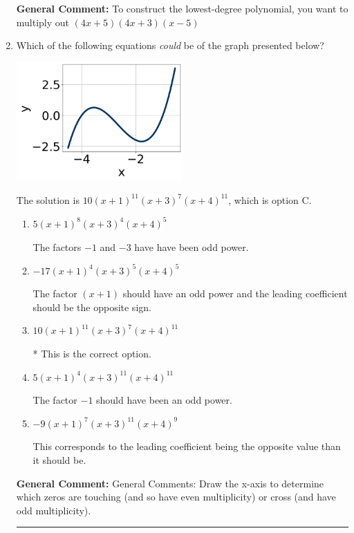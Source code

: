 \documentclass{extbook}[14pt]
\newcommand{\litem}[1]{\item #1

\rule{\textwidth}{0.4pt}}
\begin{document}
\begin{enumerate}
{\textbf{General Comment:} To construct the lowest-degree polynomial, you want to multiply out $(4x + 5)(4x + 3)(x -5)$
}
\litem{
Which of the following equations \textit{could} be of the graph presented below?

\begin{center}
    \includegraphics[width=0.5\textwidth]{../Figures/polyGraphToFunctionA.png}
\end{center}


The solution is \( 10(x + 1)^{11} (x + 3)^{7} (x + 4)^{11} \), which is option C.\begin{enumerate}[label=\Alph*.]
\item \( 5(x + 1)^{8} (x + 3)^{4} (x + 4)^{5} \)

The factors $-1$ and $-3$ have have been odd power.
\item \( -17(x + 1)^{4} (x + 3)^{5} (x + 4)^{5} \)

The factor $(x + 1)$ should have an odd power and the leading coefficient should be the opposite sign.
\item \( 10(x + 1)^{11} (x + 3)^{7} (x + 4)^{11} \)

* This is the correct option.
\item \( 5(x + 1)^{4} (x + 3)^{11} (x + 4)^{11} \)

The factor $-1$ should have been an odd power.
\item \( -9(x + 1)^{7} (x + 3)^{11} (x + 4)^{9} \)

This corresponds to the leading coefficient being the opposite value than it should be.
\end{enumerate}

\textbf{General Comment:} General Comments: Draw the x-axis to determine which zeros are touching (and so have even multiplicity) or cross (and have odd multiplicity).
}
\end{enumerate}
\end{document}

